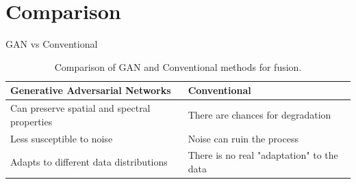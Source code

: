 \documentclass{beamer}
\begin{document}
\section{Comparison}
\begin{frame}{GAN vs Conventional}
    \begin{table}
        \centering
        \begin{tabular}{|| p{5cm} | p{5cm} ||} 
             \hline
             \textbf{Generative Adversarial Networks} & \textbf{Conventional} \\ [0.5ex] 
             \hline\hline
             Can preserve spatial and spectral properties & There are chances for degradation \\ 
             \hline
             Less susceptible to noise & Noise can ruin the process \\
             \hline
             Adapts to different data distributions & There is no real "adaptation" to the data \\
             \hline
        \end{tabular}
        \caption{Comparison of GAN and Conventional methods for fusion.}
        \label{table:tab-1}
    \end{table}
\end{frame}
\end{document}
